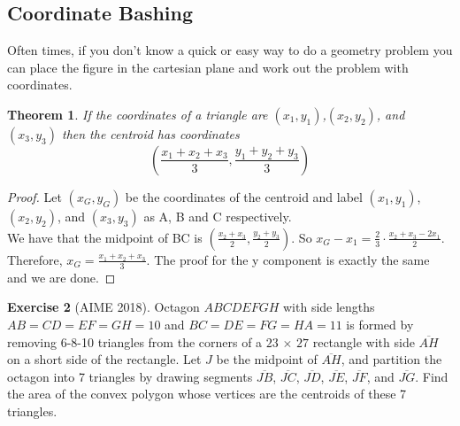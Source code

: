 \documentclass[letterpaper]{article}
\theoremstyle{plain}
\newtheorem{thm}{Theorem}[section]
\theoremstyle{definition}
\newtheorem{exercise}[thm]{Exercise}
\theoremstyle{remark}
\begin{document}
    \subsection{Coordinate Bashing}
    Often times, if you don't know a quick or easy way to do a geometry problem you can place the figure in the cartesian plane and work out the problem with coordinates.
    \begin{mdframed}
        \begin{thm}
            If the coordinates of a triangle are $(x_1,y_1)$,$(x_2,y_2)$, and $(x_3,y_3)$ then the centroid has coordinates $$\left(\frac{x_1+x_2+x_3}{3},\frac{y_1+y_2+y_3}{3}\right)$$
        \end{thm}
        
    \end{mdframed}
    \begin{proof}
        Let $(x_G,y_G)$ be the coordinates of the centroid and label $(x_1,y_1)$,$(x_2,y_2)$, and $(x_3,y_3)$ as A, B and C respectively.
        \\We have that the midpoint of BC is $\left(\frac{x_2+x_3}{2},\frac{y_2+y_3}{2}\right)$. So $x_G-x_1=\frac{2}{3}\cdot\frac{x_2+x_3-2x_1}{2}$.
        Therefore, $x_G = \frac{x_1+x_2+x_3}{3}$. The proof for the y component is exactly the same and we are done.
         
    \end{proof}
    \begin{exercise}[AIME 2018]
        Octagon $ABCDEFGH$ with side lengths $AB = CD = EF = GH = 10$ and $BC = DE = FG = HA = 11$ is formed by removing 6-8-10 triangles from the corners of a $23$ $\times$ $27$ rectangle with side $\overline{AH}$ on a short side of the rectangle. Let $J$ be the midpoint of $\overline{AH}$, and partition the octagon into 7 triangles by drawing segments $\overline{JB}$, $\overline{JC}$, $\overline{JD}$, $\overline{JE}$, $\overline{JF}$, and $\overline{JG}$. Find the area of the convex polygon whose vertices are the centroids of these 7 triangles.
    \end{exercise}
\end{document}
